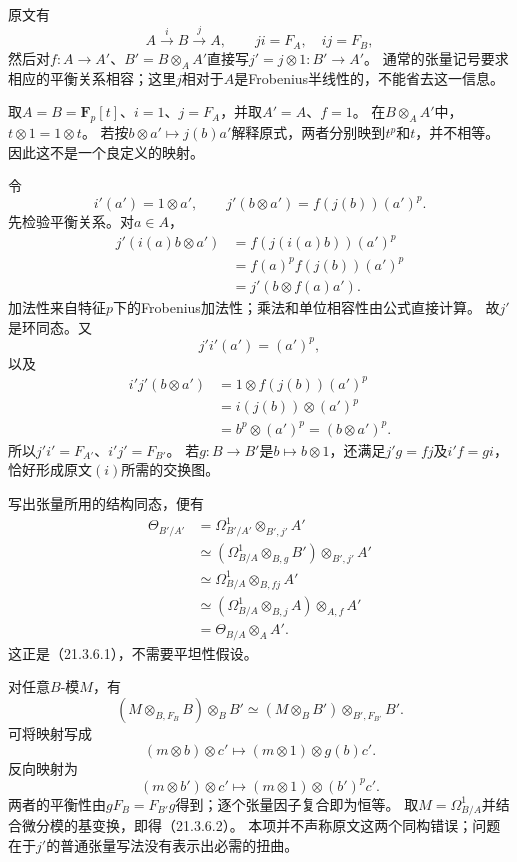原文有
\[
 A\xrightarrow{i}B\xrightarrow{j}A,\qquad ji=F_A,\quad ij=F_B,
\]
然后对$f:A\to A'$、$B'=B\otimes_A A'$直接写$j'=j\otimes1:B'\to A'$。
通常的张量记号要求相应的平衡关系相容；这里$j$相对于$A$是Frobenius半线性的，不能省去这一信息。

取$A=B=\mathbf F_p[t]$、$i=1$、$j=F_A$，并取$A'=A$、$f=1$。
在$B\otimes_A A'$中，$t\otimes1=1\otimes t$。
若按$b\otimes a'\mapsto j(b)a'$解释原式，两者分别映到$t^p$和$t$，并不相等。
因此这不是一个良定义的映射。

令
\[
 i'(a')=1\otimes a',\qquad
 j'(b\otimes a')=f(j(b))(a')^p.
\]
先检验平衡关系。对$a\in A$，
\begin{align*}
 j'(i(a)b\otimes a')
 &=f(j(i(a)b))(a')^p\\
 &=f(a)^p f(j(b))(a')^p\\
 &=j'(b\otimes f(a)a').
\end{align*}
加法性来自特征$p$下的Frobenius加法性；乘法和单位相容性由公式直接计算。
故$j'$是环同态。又
\[
 j'i'(a')=(a')^p,
\]
以及
\begin{align*}
 i'j'(b\otimes a')
 &=1\otimes f(j(b))(a')^p\\
 &=i(j(b))\otimes(a')^p\\
 &=b^p\otimes(a')^p=(b\otimes a')^p.
\end{align*}
所以$j'i'=F_{A'}$、$i'j'=F_{B'}$。
若$g:B\to B'$是$b\mapsto b\otimes1$，还满足$j'g=fj$及$i'f=gi$，
恰好形成原文$(i)$所需的交换图。

写出张量所用的结构同态，便有
\begin{align*}
 \Theta_{B'/A'}
 &=\Omega^1_{B'/A'}\otimes_{B',j'}A'\\
 &\simeq(\Omega^1_{B/A}\otimes_{B,g}B')\otimes_{B',j'}A'\\
 &\simeq\Omega^1_{B/A}\otimes_{B,fj}A'\\
 &\simeq(\Omega^1_{B/A}\otimes_{B,j}A)\otimes_{A,f}A'\\
 &=\Theta_{B/A}\otimes_A A'.
\end{align*}
这正是（21.3.6.1），不需要平坦性假设。

对任意$B$-模$M$，有
\[
 (M\otimes_{B,F_B}B)\otimes_B B'
 \simeq(M\otimes_B B')\otimes_{B',F_{B'}}B'.
\]
可将映射写成
\[
 (m\otimes b)\otimes c'\longmapsto(m\otimes1)\otimes g(b)c'.
\]
反向映射为
\[
 (m\otimes b')\otimes c'\longmapsto(m\otimes1)\otimes(b')^p c'.
\]
两者的平衡性由$gF_B=F_{B'}g$得到；逐个张量因子复合即为恒等。
取$M=\Omega^1_{B/A}$并结合微分模的基变换，即得（21.3.6.2）。
本项并不声称原文这两个同构错误；问题在于$j'$的普通张量写法没有表示出必需的扭曲。

